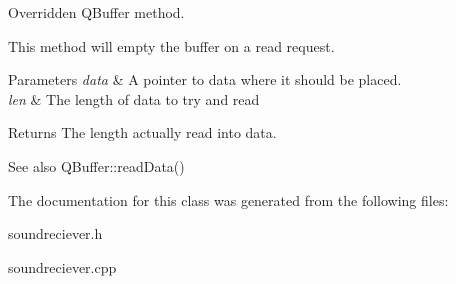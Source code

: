 \-Overridden \-Q\-Buffer method. 

\-This method will empty the buffer on a read request. 
\begin{DoxyParams}{\-Parameters}
{\em data} & \-A pointer to data where it should be placed. \\
\hline
{\em len} & \-The length of data to try and read \\
\hline
\end{DoxyParams}
\begin{DoxyReturn}{\-Returns}
\-The length actually read into data. 
\end{DoxyReturn}
\begin{DoxySeeAlso}{\-See also}
\-Q\-Buffer\-::read\-Data() 
\end{DoxySeeAlso}


\-The documentation for this class was generated from the following files\-:\begin{DoxyCompactItemize}
\item 
soundreciever.\-h\item 
soundreciever.\-cpp\end{DoxyCompactItemize}
